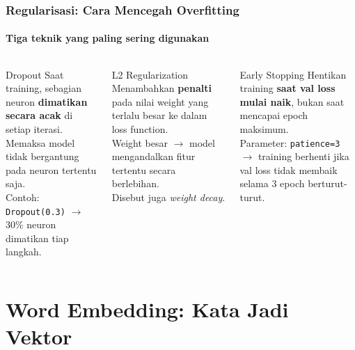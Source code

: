 \documentclass[t,aspectratio=169,xcolor=dvipsnames]{beamer}
\begin{document}
\begin{frame}
    \frametitle{Regularisasi: Cara Mencegah Overfitting}
    \framesubtitle{Tiga teknik yang paling sering digunakan}
    \small
    \begin{columns}[T]
        \begin{block}{Dropout}
            Saat training, sebagian neuron \textbf{dimatikan secara acak} di setiap iterasi.\\[0.3em]
            Memaksa model tidak bergantung pada neuron tertentu saja.\\[0.3em]
            \footnotesize Contoh: \texttt{Dropout(0.3)} $\rightarrow$ 30\% neuron dimatikan tiap langkah.
        \end{block}

        \begin{exampleblock}{L2 Regularization}
            Menambahkan \textbf{penalti} pada nilai weight yang terlalu besar ke dalam loss function.\\[0.3em]
            Weight besar $\rightarrow$ model mengandalkan fitur tertentu secara berlebihan.\\[0.3em]
            \footnotesize Disebut juga \textit{weight decay}.
        \end{exampleblock}

        \begin{alertblock}{Early Stopping}
            Hentikan training \textbf{saat val loss mulai naik}, bukan saat mencapai epoch maksimum.\\[0.3em]
            \footnotesize Parameter: \texttt{patience=3} $\rightarrow$ training berhenti jika val loss tidak membaik selama 3 epoch berturut-turut.
        \end{alertblock}
    \end{columns}
\end{frame}

\section{Word Embedding: Kata Jadi Vektor}
\end{document}
